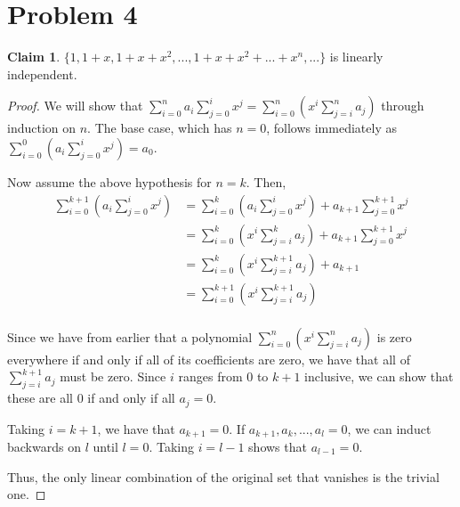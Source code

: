 \documentclass[12pt,letterpaper]{article}
\theoremstyle{definition}
\newtheorem*{claim}{Claim}
\begin{document}
\section*{Problem 4}

\begin{claim}
  $\{1, 1 + x, 1 + x + x^2, ..., 1 + x + x^2 + ... + x^n, ...\}$ is linearly independent.
\end{claim}

\begin{proof}


  We will show that $\sum_{i=0}^na_i\sum_{j=0}^ix^j =
  \sum_{i=0}^{n}(x^i\sum_{j=i}^{n}a_j)$ through induction on $n$. The base case,
  which has $n = 0$, follows immediately as $\sum_{i=0}^0(a_i\sum_{j=0}^ix^j) =
  a_0$.

  Now assume the above hypothesis for $n = k$. Then,
  \begin{align*}
    \sum_{i=0}^{k+1}(a_i\sum_{j=0}^ix^j) &= \sum_{i=0}^k(a_i\sum_{j=0}^ix^j) + a_{k+1}\sum_{j=0}^{k+1}x^j \\
                                         &= \sum_{i=0}^{k}(x^{i}\sum_{j=i}^{k}a_j) + a_{k+1}\sum_{j=0}^{k+1}x^j \\
                                         &= \sum_{i=0}^k(x^i\sum_{j=i}^{k+1}a_j) + a_{k+1}  \\
                                         &= \sum_{i=0}^{k+1}(x^i\sum_{j=i}^{k+1}a_j)  \\
  \end{align*}

  Since we have from earlier that a polynomial
  $\sum_{i=0}^{n}(x^i\sum_{j=i}^{n}a_j)$ is zero everywhere if and only if
  all of its coefficients are zero, we have that all of $\sum_{j=i}^{k+1}a_j$
  must be zero. Since $i$ ranges from 0 to $k+1$ inclusive, we can show that these
  are all $0$ if and only if all $a_j = 0$.

  Taking $i = k + 1$, we have that $a_{k+1} = 0$. If $a_{k+1}, a_{k}, ..., a_{l}
  = 0$, we can induct backwards on $l$ until $l = 0$. Taking $i = l - 1$ shows
  that $a_{l - 1} = 0$.

  Thus, the only linear combination of the original set that vanishes is the
  trivial one.
\end{proof}
\end{document}
